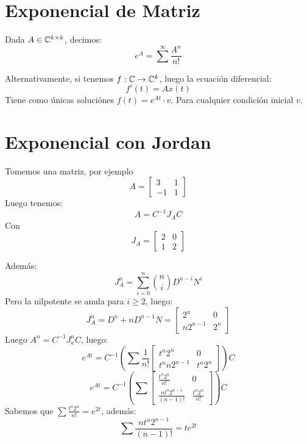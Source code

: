 \documentclass{article}
\begin{document}
\section*{Exponencial de Matriz}
Dada $A \in \mathbb{C}^{k \times k}$, decimos:
\[
	e^A = \sum^\infty \frac{A^n}{n!}
\]

Alternativamente, si tenemos $f : \mathbb{C} \to \mathbb{C}^k$, luego la ecuación diferencial:
\[
	f'(t) = Ax(t)
\]
Tiene como únicas soluciónes $f(t) = e^{At} \cdot v$. Para cualquier condición inicial $v$.

\section*{Exponencial con Jordan}
Tomemos una matriz, por ejemplo
\[
	A =
	\begin{bmatrix}
		3 & 1 \\
		-1 & 1
	\end{bmatrix}
\]
Luego tenemos:
\[
A = C^{-1} J_A C\]
Con \[
	J_A =
	\begin{bmatrix}
		2 & 0 \\
		1 & 2
	\end{bmatrix}
\]

Además:
\[
	J_A^n = \sum_{i = 0}^n {n \choose i} D^{n-i} N^i
\]
Pero la nilpotente se anula para $i \geq 2$, luego:
\[
	J_A^n = D^n + nD^{n-1}N =
	\begin{bmatrix}
		2^n & 0 \\
		n2^{n-1} & 2^n
	\end{bmatrix}
\]
Luego $A^n = C^{-1} J_a^n C$, luego:
\[
	e^{At} = C^{-1} \left(\sum \frac{1}{n!}
		\begin{bmatrix}
			t^n2^n & 0 \\
			t^nn2^{n-1} & t^n2^n
		\end{bmatrix}
	\right) C
\]
\[
	e^{At} = C^{-1} \left(\sum
		\begin{bmatrix}
			\frac{t^n2^n}{n!} & 0 \\
			\frac{nt^n2^{n-1}}{(n-1)!} & \frac{t^n2^n}{n!}
		\end{bmatrix}
	\right) C
\]
Sabemos que $\sum \frac{t^n2^n}{n!} = e^{2t}$, además:
\[
	\sum \frac{nt^n2^{n-1}}{(n-1)!} = te^{2t}
\]
\end{document}

